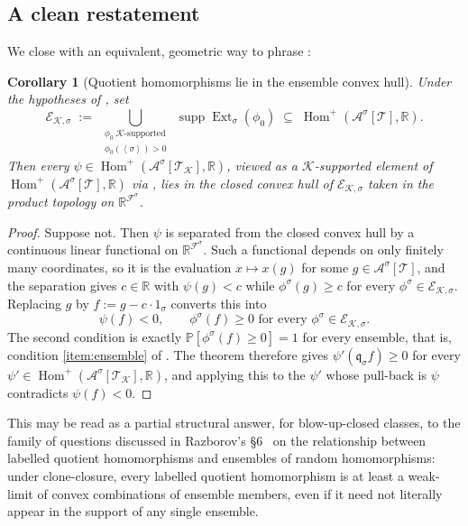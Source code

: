 \documentclass[11pt]{article}
\newtheorem{corollary}[theorem]{Corollary}
\theoremstyle{definition}
\newcommand{\R}{\mathbb{R}}
\newcommand{\Prob}{\mathbb{P}}
\newcommand{\A}{\mathcal{A}}
\newcommand{\F}{\mathcal{F}}
\newcommand{\K}{\mathcal{K}}
\newcommand{\T}{\mathcal{T}}
\newcommand{\Homp}{\operatorname{Hom}^{+}}
\newcommand{\Ext}{\operatorname{Ext}}
\newcommand{\brak}[1]{\left\langle #1\right\rangle}
\newcommand{\q}{\mathfrak{q}}
\begin{document}
\subsection{A clean restatement}

We close with an equivalent, geometric way to phrase :

\begin{corollary}[Quotient homomorphisms lie in the ensemble convex hull]\label{cor:image}
Under the hypotheses of , set
\[
  \mathcal{E}_{\K,\sigma}
  \;:=\;
  \bigcup_{\substack{\phi_0\ \K\text{-supported}\\\phi_0(\brak\sigma)>0}}
  \;\operatorname{supp}\Ext_\sigma(\phi_0)
  \;\subseteq\; \Homp(\A^\sigma[\T],\R).
\]
Then every $\psi\in\Homp(\A^\sigma[\T_\K],\R)$, viewed as a $\K$-supported
element of $\Homp(\A^\sigma[\T],\R)$ via ,
lies in the closed convex hull of $\mathcal{E}_{\K,\sigma}$ taken in the
product topology on $\R^{\F^\sigma}$.
\end{corollary}

\begin{proof}
Suppose not.  Then $\psi$ is separated from the closed convex hull by a
continuous linear functional on $\R^{\F^\sigma}$.  Such a functional
depends on only finitely many coordinates, so it is the evaluation
$x\mapsto x(g)$ for some $g\in\A^\sigma[\T]$, and the separation gives
$c\in\R$ with $\psi(g)<c$ while $\phi^\sigma(g)\ge c$ for every
$\phi^\sigma\in\mathcal{E}_{\K,\sigma}$.  Replacing $g$ by
$f:=g-c\cdot 1_\sigma$ converts this into
\[
  \psi(f)<0,
  \qquad
  \phi^\sigma(f)\ge 0\text{ for every }\phi^\sigma\in\mathcal{E}_{\K,\sigma}.
\]
The second condition is exactly $\Prob[\phi^\sigma(f)\ge 0]=1$ for every
ensemble, that is, condition \ref{item:ensemble} of .
The theorem therefore gives $\psi'(\q_\sigma f)\ge 0$ for every
$\psi'\in\Homp(\A^\sigma[\T_\K],\R)$, and applying this to the $\psi'$
whose pull-back is $\psi$ contradicts $\psi(f)<0$.
\end{proof}

This may be read as a partial structural answer, for blow-up-closed
classes, to the family of questions discussed in Razborov's
\S6~\cite[\S6]{Razborov2007} on the relationship between labelled
quotient homomorphisms and ensembles of random homomorphisms: under
clone-closure, every labelled quotient homomorphism is at least a
weak-limit of convex combinations of ensemble members, even if it need
not literally appear in the support of any single ensemble.
\end{document}
